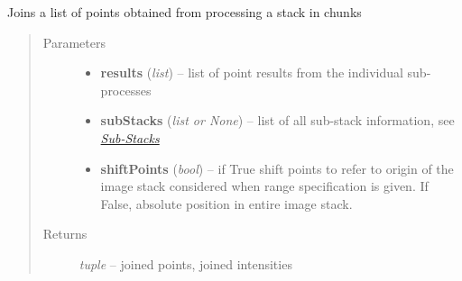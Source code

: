 \documentclass[letterpaper,10pt,english]{sphinxmanual}
\begin{document}
\begin{fulllineitems}
\label{api/ClearMap.ImageProcessing:ClearMap.ImageProcessing.StackProcessing.joinPoints}
Joins a list of points obtained from processing a stack in chunks
\begin{quote}\begin{description}
\item[{Parameters}] \leavevmode\begin{itemize}
\item {} 
\textbf{results} (\emph{list}) --
list of point results from the individual sub-processes

\item {} 
\textbf{subStacks} (\emph{list or None}) --
list of all sub-stack information, see {\hyperref[api/ClearMap.ImageProcessing:substack]{\emph{Sub-Stacks}}}

\item {} 
\textbf{shiftPoints} (\emph{bool}) --
if True shift points to refer to origin of the image stack considered
when range specification is given. If False, absolute
position in entire image stack.

\end{itemize}

\item[{Returns}] \leavevmode
\emph{tuple} --
joined points, joined intensities

\end{description}\end{quote}

\end{fulllineitems}

\end{document}
